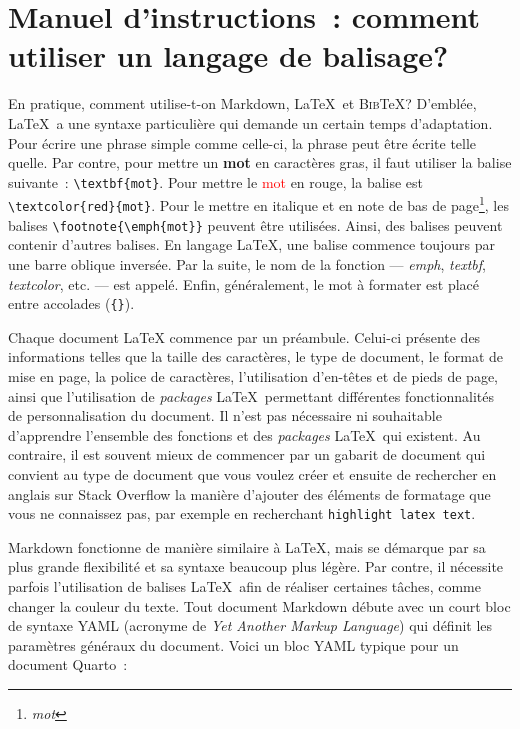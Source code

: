 \documentclass[
  letterpaper,
  DIV=11,
  numbers=noendperiod]{scrreprt}
\begin{document}
\hypertarget{manuel-dinstructions-comment-utiliser-un-langage-de-balisage}{%
\section{Manuel d'instructions~: comment utiliser un langage de
balisage?}\label{manuel-dinstructions-comment-utiliser-un-langage-de-balisage}}

En pratique, comment utilise-t-on Markdown, \LaTeX~et \textsc{Bib}\TeX?
D'emblée, \LaTeX~a une syntaxe particulière qui demande un certain temps
d'adaptation. Pour écrire une phrase simple comme celle-ci, la phrase
peut être écrite telle quelle. Par contre, pour mettre un \textbf{mot}
en caractères gras, il faut utiliser la balise suivante~:
\texttt{\textbackslash{}textbf\{mot\}}. Pour mettre le
\textcolor{red}{mot} en rouge, la balise est
\texttt{\textbackslash{}textcolor\{red\}\{mot\}}. Pour le mettre en
italique et en note de bas de page\footnote{\emph{mot}}, les balises
\texttt{\textbackslash{}footnote\{\textbackslash{}emph\{mot\}\}} peuvent
être utilisées. Ainsi, des balises peuvent contenir d'autres balises. En
langage \LaTeX, une balise commence toujours par une barre oblique
inversée. Par la suite, le nom de la fonction --- \emph{emph},
\emph{textbf}, \emph{textcolor}, etc. --- est appelé. Enfin,
généralement, le mot à formater est placé entre accolades
(\texttt{\{\}}).

Chaque document \LaTeX{} commence par un préambule. Celui-ci présente
des informations telles que la taille des caractères, le type de
document, le format de mise en page, la police de caractères,
l'utilisation d'en-têtes et de pieds de page, ainsi que l'utilisation de
\emph{packages} \LaTeX~permettant différentes fonctionnalités de
personnalisation du document. Il n'est pas nécessaire ni souhaitable
d'apprendre l'ensemble des fonctions et des \emph{packages} \LaTeX~qui
existent. Au contraire, il est souvent mieux de commencer par un gabarit
de document qui convient au type de document que vous voulez créer et
ensuite de rechercher en anglais sur Stack Overflow la manière d'ajouter
des éléments de formatage que vous ne connaissez pas, par exemple en
recherchant \texttt{highlight\ latex\ text}.

Markdown fonctionne de manière similaire à \LaTeX, mais se démarque par
sa plus grande flexibilité et sa syntaxe beaucoup plus légère. Par
contre, il nécessite parfois l'utilisation de balises \LaTeX~afin de
réaliser certaines tâches, comme changer la couleur du texte. Tout
document Markdown débute avec un court bloc de syntaxe YAML (acronyme de
\emph{Yet Another Markup Language}) qui définit les paramètres généraux
du document. Voici un bloc YAML typique pour un document Quarto~:
\end{document}
